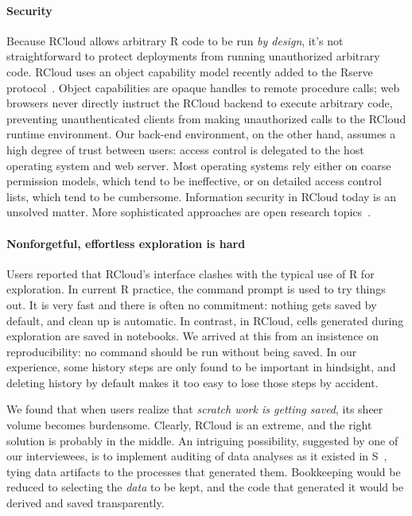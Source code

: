 \paragraph*{Security}
Because RCloud allows arbitrary R code to be run
\emph{by design}, it's not straightforward to protect deployments
from running unauthorized arbitrary code. RCloud uses an object capability model
\cite{Miller:2006:RCT} recently added to the Rserve
protocol~\cite{Urbanek:2003:AFW}. Object capabilities are opaque handles
to remote procedure calls; web browsers never directly instruct the
RCloud backend to execute arbitrary code, preventing unauthenticated clients
from making unauthorized calls to the RCloud runtime environment.
%
Our back-end environment, on the other hand, assumes a high degree of trust between users:
access control is delegated to the host operating system and web server.
Most operating systems rely either on coarse permission models,
which tend to be ineffective, or on detailed access control
lists, which tend to be cumbersome.
Information security in RCloud today is an unsolved matter.
More sophisticated approaches are open research topics~\cite{Moore:2011:SAF}.

\paragraph*{Nonforgetful, effortless exploration is hard}
Users reported that RCloud's interface clashes with the
typical use of R for exploration.
In current R practice, the command prompt is used to try things out.
It is very fast and there is often no commitment: nothing gets saved by
default, and clean up is automatic. In contrast, in RCloud,
cells generated during exploration are saved in notebooks.
We arrived at this from an insistence on reproducibility: 
no command should be run without being saved.
In our experience, some history steps are only found to be
important in hindsight, and deleting history by default makes
it too easy to lose those steps by accident.

We found that when users realize that \emph{scratch work
is getting saved}, its sheer volume becomes burdensome.
Clearly, RCloud is an extreme, and the right solution is
probably in the middle. An intriguing possibility,
suggested by one of our interviewees, is to implement auditing of data
analyses as it existed in S~\cite{Becker:1988:Auditing}, tying
data artifacts to the processes that generated them. 
Bookkeeping would be reduced to selecting the \emph{data} to be kept,
and the code that generated it would be derived and saved transparently.

